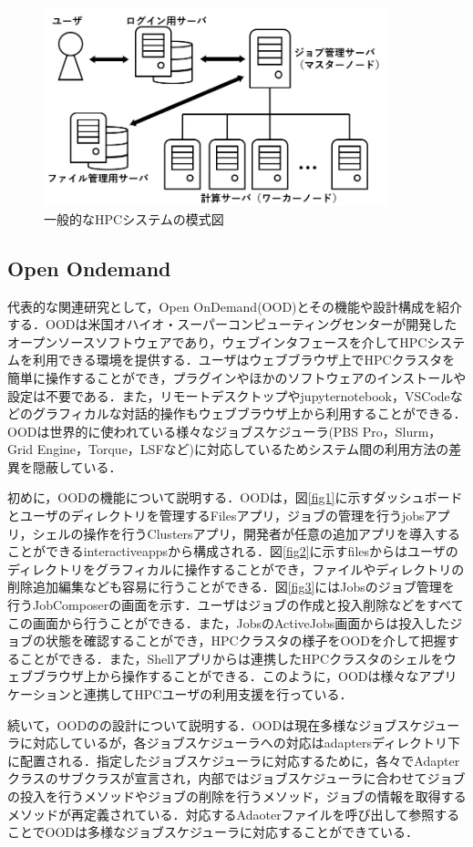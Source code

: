 \begin{figure}[tb]
    \centering
    \includegraphics[width=100mm]{./fig/HPCsystem.png}
    \caption{一般的なHPCシステムの模式図}
    \label{fig4}
\end{figure}

\subsection{Open Ondemand}
代表的な関連研究として，Open OnDemand(OOD)とその機能や設計構成を紹介する\cite{cite2}\cite{cite3}．OODは米国オハイオ・スーパーコンピューティングセンターが開発したオープンソースソフトウェアであり，ウェブインタフェースを介してHPCシステムを利用できる環境を提供する．ユーザはウェブブラウザ上でHPCクラスタを簡単に操作することができ，プラグインやほかのソフトウェアのインストールや設定は不要である．また，リモートデスクトップやjupyternotebook，VSCodeなどのグラフィカルな対話的操作もウェブブラウザ上から利用することができる．OODは世界的に使われている様々なジョブスケジューラ(PBS Pro，Slurm，Grid Engine，Torque，LSFなど)に対応しているためシステム間の利用方法の差異を隠蔽している．\par
初めに，OODの機能について説明する．OODは，図\ref{fig1}に示すダッシュボードとユーザのディレクトリを管理するFilesアプリ，ジョブの管理を行うjobsアプリ，シェルの操作を行うClustersアプリ，開発者が任意の追加アプリを導入することができるinteractiveappsから構成される．図\ref{fig2}に示すfilesからはユーザのディレクトリをグラフィカルに操作することができ，ファイルやディレクトリの削除追加編集なども容易に行うことができる．図\ref{fig3}にはJobsのジョブ管理を行うJobComposerの画面を示す．ユーザはジョブの作成と投入削除などをすべてこの画面から行うことができる．また，JobsのActiveJobs画面からは投入したジョブの状態を確認することができ，HPCクラスタの様子をOODを介して把握することができる．また，Shellアプリからは連携したHPCクラスタのシェルをウェブブラウザ上から操作することができる．このように，OODは様々なアプリケーションと連携してHPCユーザの利用支援を行っている．\par
続いて，OODのの設計について説明する．OODは現在多様なジョブスケジューラに対応しているが，各ジョブスケジューラへの対応はadaptersディレクトリ下に配置される．指定したジョブスケジューラに対応するために，各々でAdapterクラスのサブクラスが宣言され，内部ではジョブスケジューラに合わせてジョブの投入を行うメソッドやジョブの削除を行うメソッド，ジョブの情報を取得するメソッドが再定義されている．対応するAdaoterファイルを呼び出して参照することでOODは多様なジョブスケジューラに対応することができている．\par

